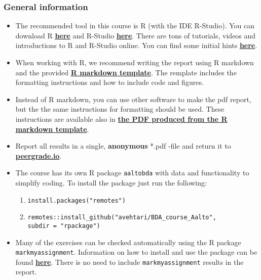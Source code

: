 
\subsubsection*{General information}


\begin{itemize}
\itemsep0em
\item The recommended tool in this course is R (with the IDE R-Studio). You can download R \href{https://cran.r-project.org/}{\textbf{here}} and R-Studio \href{https://www.rstudio.com/products/rstudio/download/}{\textbf{here}}. There are tons of tutorials, videos and introductions to R and R-Studio online. You can find some initial hints \href{https://www.rstudio.com/online-learning/}{\textbf{here}}.
\item When working with R, we recommend writing the report using R markdown and the provided \href{https://raw.githubusercontent.com/avehtari/BDA_course_Aalto/master/templates/assignment_template.rmd}{\textbf{R markdown template}}. The remplate includes the formatting instructions and how to include code and figures.
\item Instead of R markdown, you can use other software to make the pdf report, but the the same instructions for formatting should be used. These instructions are available also in \href{https://raw.githubusercontent.com/avehtari/BDA_course_Aalto/master/templates/assignment_template.pdf}{\textbf{the PDF produced from the R markdown template}}.
\item  Report all results in a single, {\bf anonymous} *.pdf -file and return it to \href{peergrade.io}{\textbf{peergrade.io}}.
\item The course has its own R package \texttt{aaltobda} with data and functionality to simplify coding. To install the package just run the following:
\begin{enumerate}
\item \texttt{install.packages("remotes")}
\item \texttt{remotes::install\_github("avehtari/BDA\_course\_Aalto", \\ subdir = "rpackage")}
\end{enumerate}
\item Many of the exercises can be checked automatically using the R package \\ \texttt{markmyassignment}. Information on how to install and use the package can be found \href{https://cran.r-project.org/web/packages/markmyassignment/vignettes/markmyassignment.html}{\textbf{here}}. There is no need to include \texttt{markmyassignment} results in the report.

\end{itemize}
